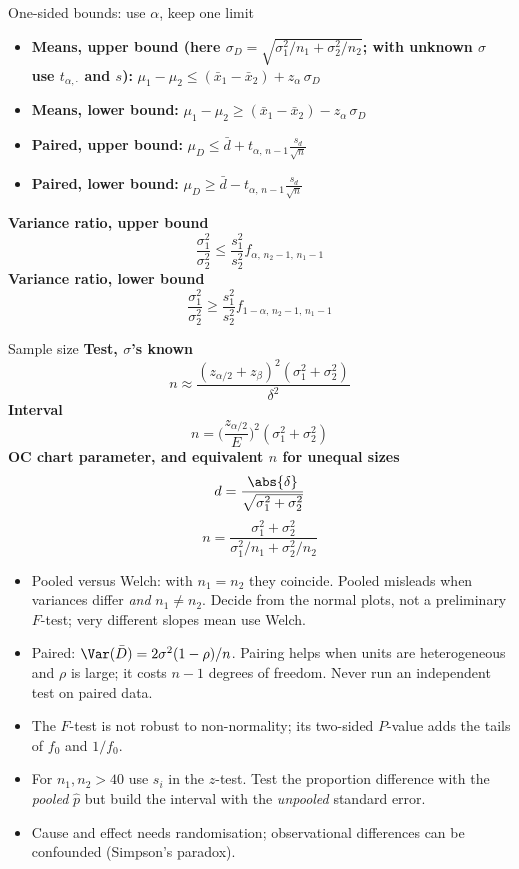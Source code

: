 \begin{formulabox}{One-sided bounds: use $\alpha$, keep one limit}
\begin{itemize}
  \item \textbf{Means, upper bound (here $\sigma_D=\sqrt{\sigma_1^2/n_1+\sigma_2^2/n_2}$; with unknown $\sigma$ use $t_{\alpha,\cdot}$ and $s$):} $\mu_1-\mu_2\le(\bar{x}_1-\bar{x}_2)+z_\alpha\,\sigma_D$
  \item \textbf{Means, lower bound:} $\mu_1-\mu_2\ge(\bar{x}_1-\bar{x}_2)-z_\alpha\,\sigma_D$
  \item \textbf{Paired, upper bound:} $\mu_D\le\bar{d}+t_{\alpha,\,n-1}\tfrac{s_d}{\sqrt n}$
  \item \textbf{Paired, lower bound:} $\mu_D\ge\bar{d}-t_{\alpha,\,n-1}\tfrac{s_d}{\sqrt n}$
\end{itemize}
\textbf{Variance ratio, upper bound}
\[ \frac{\sigma_1^2}{\sigma_2^2}\le\frac{s_1^2}{s_2^2}f_{\alpha,\,n_2-1,\,n_1-1} \]
\textbf{Variance ratio, lower bound}
\[ \frac{\sigma_1^2}{\sigma_2^2}\ge\frac{s_1^2}{s_2^2}f_{1-\alpha,\,n_2-1,\,n_1-1} \]
\end{formulabox}

\begin{formulabox}{Sample size}
\textbf{Test, $\sigma$'s known}
\[ n\approx\frac{(z_{\alpha/2}+z_\beta)^2(\sigma_1^2+\sigma_2^2)}{\delta^2} \]
\textbf{Interval}
\[ n=\Big(\frac{z_{\alpha/2}}{E}\Big)^2(\sigma_1^2+\sigma_2^2) \]
\textbf{OC chart parameter, and equivalent $n$ for unequal sizes}
\[ d=\frac{\abs{\delta}}{\sqrt{\sigma_1^2+\sigma_2^2}} \]
\[ n=\frac{\sigma_1^2+\sigma_2^2}{\sigma_1^2/n_1+\sigma_2^2/n_2} \]
\end{formulabox}

\begin{notebox}
\begin{itemize}
  \item Pooled versus Welch: with $n_1=n_2$ they coincide. Pooled misleads when variances differ \emph{and} $n_1\ne n_2$. Decide from the normal plots, not a preliminary $F$-test; very different slopes mean use Welch.
  \item Paired: $\Var(\bar{D})=2\sigma^2(1-\rho)/n$. Pairing helps when units are heterogeneous and $\rho$ is large; it costs $n-1$ degrees of freedom. Never run an independent test on paired data.
  \item The $F$-test is not robust to non-normality; its two-sided $P$-value adds the tails of $f_0$ and $1/f_0$.
  \item For $n_1,n_2>40$ use $s_i$ in the $z$-test. Test the proportion difference with the \emph{pooled} $\hat{p}$ but build the interval with the \emph{unpooled} standard error.
  \item Cause and effect needs randomisation; observational differences can be confounded (Simpson's paradox).
\end{itemize}
\end{notebox}


